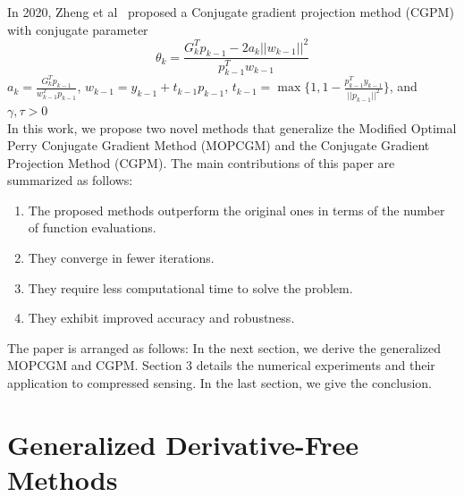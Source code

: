 \documentclass{article}
\theoremstyle{remark}
\begin{document}
In 2020, Zheng et al~\cite{zheng2020conjugate} proposed a Conjugate gradient projection method (CGPM) with conjugate parameter 
\begin{equation}
\label{eq:HZ}
\theta_k=\frac{G_k^Tp_{k-1}-2a_k||w_{k-1}||^2}{p_{k-1}^Tw_{k-1}}
\end{equation}
  $a_k=\frac{G_k^Tp_{k-1}}{w_{k-1}^Tp_{k-1}}$, $w_{k-1}=y_{k-1}+t_{k-1}p_{k-1}$, $t_{k-1}=\max\{1,1-\frac{p_{k-1}^Ty_{k-1}}{||p_{k-1}||^2}\}$, and  $\gamma, \tau>0$\\
In this work, we propose two novel methods that generalize the Modified Optimal Perry Conjugate Gradient Method (MOPCGM) and the Conjugate Gradient Projection Method (CGPM). The main contributions of this paper are summarized as follows: \begin{enumerate} \item[(i)] The proposed methods outperform the original ones in terms of the number of function evaluations. \item[(ii)] They converge in fewer iterations. \item[(iii)] They require less computational time to solve the problem. \item[(iv)] They exhibit improved accuracy and robustness. \end{enumerate}
The paper is arranged as follows: In the next section, we derive the generalized MOPCGM and CGPM. Section 3 details the numerical experiments and their application to compressed sensing. In the last section, we give the conclusion.
\section{Generalized Derivative-Free Methods}
\label{chp:generalMOPCGM}
\end{document}
